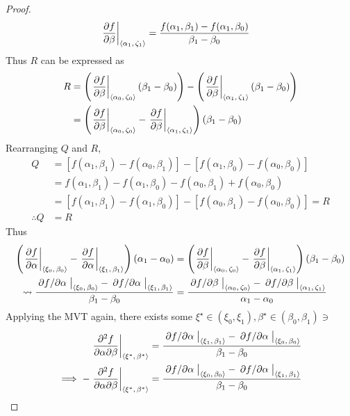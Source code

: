 \begin{lemma}
\begin{proof}
\begin{align*}
			\eval{\pdv{f}{\beta}}_{\point{\alpha_1}{\zeta_1}}&=\frac{f(\alpha_1,\beta_1)-f(\alpha_1,\beta_0)}{\beta_1-\beta_0}
		\end{align*}
		Thus $R$ can be expressed as
		\begin{align*}
			R&=\left(\eval{\pdv{f}{\beta}}_{\point{\alpha_0}{\zeta_0}}\left(\beta_1-\beta_0\right)\right)-\left(\eval{\pdv{f}{\beta}}_{\point{\alpha_1}{\zeta_1}}\left(\beta_1-\beta_0\right)\right)\\
			&=\left(\eval{\pdv{f}{\beta}}_{\point{\alpha_0}{\zeta_0}}-\eval{\pdv{f}{\beta}}_{\point{\alpha_1}{\zeta_1}}\right)\left(\beta_1-\beta_0\right)
		\end{align*}
		Rearranging $Q$ and $R$,
		\begin{align*}
			Q&=[f(\alpha_1,\beta_1)-f(\alpha_0,\beta_1)]-[f(\alpha_1,\beta_0)-f(\alpha_0,\beta_0)]\\
			&=f(\alpha_1,\beta_1)-f(\alpha_1,\beta_0)-f(\alpha_0,\beta_1)+f(\alpha_0,\beta_0)\\
			&=[f(\alpha_1,\beta_1)-f(\alpha_1,\beta_0)]-[f(\alpha_0,\beta_1)-f(\alpha_0,\beta_0)]=R\\
			\therefore Q&=R
		\end{align*}
		Thus
		\begin{align}
			\notag\left(\eval{\pdv{f}{\alpha}}_{\point{\xi_0}{\beta_0}}-\eval{\pdv{f}{\alpha}}_{\point{\xi_1}{\beta_1}}\right)\left(\alpha_1-\alpha_0\right)&=\left(\eval{\pdv{f}{\beta}}_{\point{\alpha_0}{\zeta_0}}-\eval{\pdv{f}{\beta}}_{\point{\alpha_1}{\zeta_1}}\right)\left(\beta_1-\beta_0\right)\\
			\label{proof:SYMMETRY}\leadsto\frac{\eval{\pdv*{f}{\alpha}}_{\point{\xi_0}{\beta_0}}-\eval{\pdv*{f}{\alpha}}_{\point{\xi_1}{\beta_1}}}{\beta_1-\beta_0}&=\frac{\eval{\pdv*{f}{\beta}}_{\point{\alpha_0}{\zeta_0}}-\eval{\pdv*{f}{\beta}}_{\point{\alpha_1}{\zeta_1}}}{\alpha_1-\alpha_0}
		\end{align}
		Applying the MVT again, there exists some $\xi^\star\in(\xi_0,\xi_1),\beta^\star\in(\beta_0,\beta_1)\ni$
		\begin{align*}
			\eval{\pdv{f}{\alpha}{\beta}}_{\point{\xi^\star}{\beta^\star}}&=\frac{\eval{\pdv*{f}{\alpha}}_{\point{\xi_1}{\beta_1}}-\eval{\pdv*{f}{\alpha}}_{\point{\xi_0}{\beta_0}}}{\beta_1-\beta_0}\\
			\implies-\eval{\pdv{f}{\alpha}{\beta}}_{\point{\xi^\star}{\beta^\star}}&=\frac{\eval{\pdv*{f}{\alpha}}_{\point{\xi_0}{\beta_0}}-\eval{\pdv*{f}{\alpha}}_{\point{\xi_1}{\beta_1}}}{\beta_1-\beta_0}
		\end{align*}

\end{proof}
\end{lemma}
